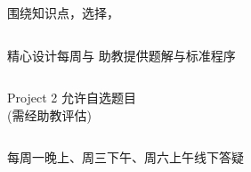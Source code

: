 \begin{frame}{}
  \begin{center}
    围绕知识点，选择，
  \end{center}
  \begin{columns}
  \end{columns}
\end{frame}

\begin{frame}{}
\end{frame}

\begin{frame}{}
  \begin{center}
    精心设计每周与 \qquad 助教提供题解与标准程序
  \end{center}

\end{frame}

\begin{frame}{}
  \begin{columns}
    \begin{center}
      Project 2 允许自选题目 \\[5pt]
      (需经助教评估)
    \end{center}
  \end{columns}
\end{frame}

\begin{frame}{}
  \begin{center}
    每周一晚上、周三下午、周六上午线下答疑
  \end{center}
\end{frame}

\begin{frame}{}
\end{frame}

\begin{frame}{}
\end{frame}

